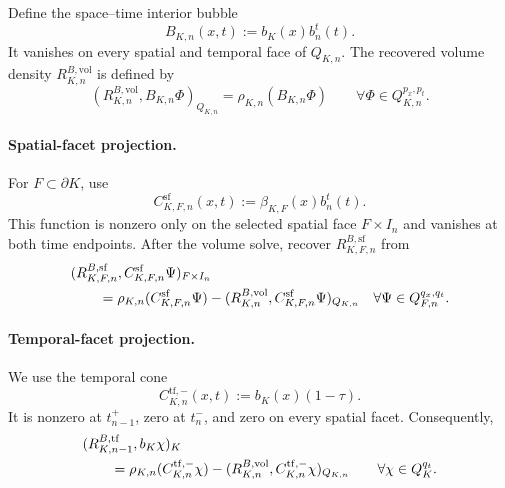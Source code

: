 \documentclass[11pt,a4paper]{article}
\begin{document}
Define the space--time interior bubble
\[
 B_{K,n}(x,t):=b_K(x)b_n^t(t).
\]
It vanishes on every spatial and temporal face of \(Q_{K,n}\). The recovered volume density \(R_{K,n}^{B,\mathrm{vol}}\) is defined by
\begin{equation}
 \boxed{
 (R_{K,n}^{B,\mathrm{vol}},B_{K,n}\Phi)_{Q_{K,n}}
 =
 \rho_{K,n}(B_{K,n}\Phi)
 \qquad
 \forall\Phi\in Q_{K,n}^{p_x,p_t}.}
 \label{eq:space-time-volume-projection}
\end{equation}


\paragraph{Spatial-facet projection.}
For \(F\subset\partial K\), use
\begin{equation}
 C_{K,F,n}^{\mathrm{sf}}(x,t)
 :=
 \beta_{K,F}(x)b_n^t(t).
 \label{eq:space-time-spatial-cone}
\end{equation}
This function is nonzero only on the selected spatial face \(F\times I_n\) and vanishes at both time endpoints. After the volume solve, recover \(R_{K,F,n}^{B,\mathrm{sf}}\) from
\begin{align}
 &(R_{K,F,n}^{B,\mathrm{sf}},
       C_{K,F,n}^{\mathrm{sf}}\Psi)_{F\times I_n}
 \notag\\
 &\qquad =
 \rho_{K,n}(C_{K,F,n}^{\mathrm{sf}}\Psi)
 -
 (R_{K,n}^{B,\mathrm{vol}},
       C_{K,F,n}^{\mathrm{sf}}\Psi)_{Q_{K,n}}
 \quad\forall\Psi\in Q_{F,n}^{q_x,q_t}.
 \label{eq:space-time-spatial-facet-projection}
\end{align}

\paragraph{Temporal-facet projection.}
We use the temporal cone
\begin{equation}
 C_{K,n}^{\mathrm{tf},-}(x,t)
 :=
 b_K(x)(1-\tau).
 \label{eq:temporal-trace-cone}
\end{equation}
It is nonzero at \(t_{n-1}^{+}\), zero at \(t_n^{-}\), and zero on every spatial facet. Consequently,
\begin{align}
 &(R_{K,n-1}^{B,\mathrm{tf}},b_K\chi)_K
 \notag\\
 &\qquad =
 \rho_{K,n}(C_{K,n}^{\mathrm{tf},-}\chi)
 -
 (R_{K,n}^{B,\mathrm{vol}},
       C_{K,n}^{\mathrm{tf},-}\chi)_{Q_{K,n}}
 \qquad\forall\chi\in Q_K^{q_t}.
 \label{eq:temporal-facet-projection}
\end{align}
\end{document}
